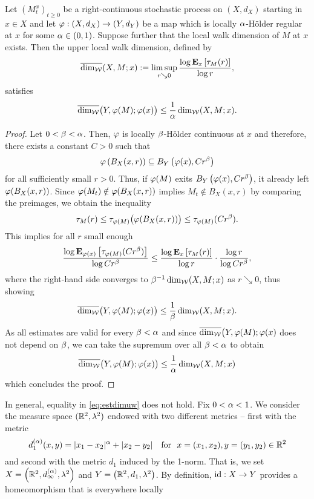 \begin{lem}\label{lem:dimuw1}
  Let $\left(M_t^x\right)_{t\geq0}$ be a right-continuous stochastic process on $(X,d_X)$ starting in $x\in X$ and let $\gp:(X,d_X)\to(Y,d_Y)$ be a map which is locally $\ga$-H\"older regular at $x$ for some $\ga\in(0,1)$. Suppose further that the local walk dimension of $M$ at $x$ exists. Then the upper local walk dimension, defined by
  \[
    \dimuw(X,M;x):=\limsup_{r\searrow0}
       \frac{\log\PTEp{\tau_M(r)}{x}}{\log r},
  \]
  satisfies 
  \begin{equation}\label{eq:estdimuw}
    \dimuw\big(Y,\gp(M);\gp(x)\big)
      \leq\frac{1}{\ga}\dimw(X,M;x).
  \end{equation}
\end{lem}
\begin{proof}
  Let $0<\gb<\ga$. Then, $\gp$ is locally $\gb$-H\"older continuous at $x$ and therefore, there exists a constant $C>0$ such that 
  \[
    \gp\left(B_X(x,r)\right)\ssq B_Y\left(\gp(x),Cr^\gb\right) 
  \]
  for all sufficiently small $r>0$. Thus, if $\gp(M)$ exits 
  $B_Y\left(\gp(x),Cr^\gb\right)$, it already left $\gp(B_X(x,r))$.
  Since $\gp(M_t)\notin\gp(B_X(x,r))$ implies $M_t\notin B_X(x,r)$ by comparing the preimages, we obtain the inequality
  \[
    \tau_M(r)
    \leq \tau_{\gp(M)}\big(\gp(B_X(x,r))\big)
    \leq \tau_{\gp(M)}(Cr^\gb).
  \]
  This implies for all $r$ small enough
  \[
    \frac{\log\PTEp{\tau_{\gp(M)}(Cr^\gb)}{\gp(x)}}{\log Cr^\gb}
    \leq \frac{\log\PTEp{\tau_M(r)}{x}}{\log r}
      \cdot \frac{\log r}{\log Cr^\gb},
  \]
  where the right-hand side converges to $\gb^{-1}\dimw(X,M;x)$ as $r\searrow0$, thus showing
  \[
    \dimuw\big(Y,\gp(M);\gp(x)\big)\leq \frac{1}{\gb}\dimw(X,M;x).
  \]
  As all estimates are valid for every $\gb<\ga$ and since
  $\dimuw\big(Y,\gp(M);\gp(x)$ does not depend on $\gb$, we can take the supremum over all $\gb<\ga$ to obtain
  \[
    \dimuw\big(Y,\gp(M);\gp(x)\big)\leq \frac{1}{\ga}\dimw(X,M;x)
  \]
  which concludes the proof.
\end{proof}
In general, equality in \eqref{eq:estdimuw} does not hold. Fix $0<\ga<1$. We consider the measure space $(\IR^2,\gl^2)$ endowed with two different metrics -- first with the metric 
\[
  d_1^{(\ga)}(x,y)=|x_1-x_2|^\ga+|x_2-y_2|
  \ \ \text{ for }\ x=(x_1,x_2),y=(y_1,y_2)\in\IR^2
\]
and second with the metric $d_1$ induced by the 1-norm. That is, we set $X=\left(\IR^2,d_\infty^{(\ga)},\gl^2\right)$ and 
$Y=\left(\IR^2,d_1,\gl^2\right)$. By definition, 
$\id:X\to Y$ provides a homeomorphism that is everywhere locally 
